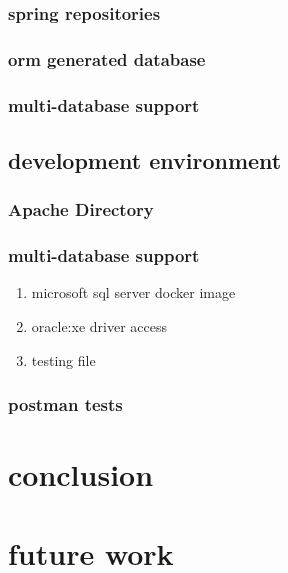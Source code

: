 \documentclass[11pt]{article}
\begin{document}
\subsubsection{spring repositories}
\label{sec:org30fbc29}
\subsubsection{orm generated database}
\label{sec:orgdbd22c9}
\subsubsection{multi-database support}
\label{sec:org7222570}

\subsection{development environment}
\label{sec:org859393e}
\subsubsection{Apache Directory}
\label{sec:org340a7e9}
\subsubsection{multi-database support}
\label{sec:org5c35ec9}
\begin{enumerate}
\item microsoft sql server docker image
\label{sec:orge7671cb}
\item oracle:xe driver access
\label{sec:org2e3c579}
\item testing file
\label{sec:orgcef1318}
\end{enumerate}
\subsubsection{postman tests}
\label{sec:orge41b4a9}
\section{conclusion}
\label{sec:org4279175}
\section{future work}
\label{sec:orgf118b91}
\end{document}
